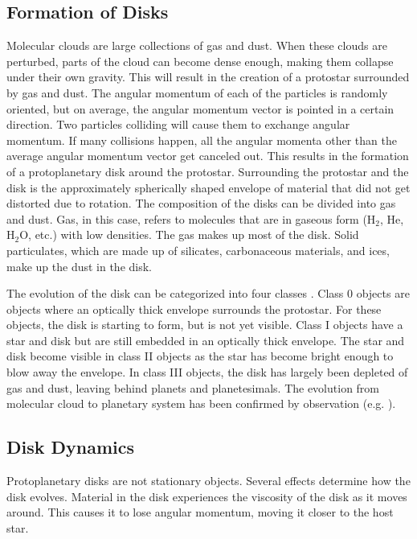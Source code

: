 \documentclass[oneside, single, authoryear, semicolon, 12pt]{lion-msc}
\newcommand{\4}{$_4$}
\newcommand{\3}{$_3$}
\newcommand{\2}{$_2$}
\begin{document}
\subsection{Formation of Disks}
Molecular clouds are large collections of gas and dust. When these clouds are perturbed, parts of the cloud can become dense enough, making them collapse under their own gravity. This will result in the creation of a protostar surrounded by gas and dust. The angular momentum of each of the particles is randomly oriented, but on average, the angular momentum vector is pointed in a certain direction. Two particles colliding will cause them to exchange angular momentum. If many collisions happen, all the angular momenta other than the average angular momentum vector get canceled out. This results in the formation of a protoplanetary disk around the protostar. Surrounding the protostar and the disk is the approximately spherically shaped envelope of material that did not get distorted due to rotation. The composition of the disks can be divided into gas and dust. Gas, in this case, refers to molecules that are in gaseous form (H\2, He, H\2O, etc.) with low densities. The gas makes up most of the disk. Solid particulates, which are made up of silicates, carbonaceous materials, and ices, make up the dust in the disk.

The evolution of the disk can be categorized into four classes \citep{1987ApJ...312..788A}. Class 0 objects are objects where an optically thick envelope surrounds the protostar. For these objects, the disk is starting to form, but is not yet visible. Class I objects have a star and disk but are still embedded in an optically thick envelope. The star and disk become visible in class II objects as the star has become bright enough to blow away the envelope. In class III objects, the disk has largely been depleted of gas and dust, leaving behind planets and planetesimals. The evolution from molecular cloud to planetary system has been confirmed by observation (e.g. \cite{source}).

\subsection{Disk Dynamics}
Protoplanetary disks are not stationary objects. Several effects determine how the disk evolves. Material in the disk experiences the viscosity of the disk as it moves around. This causes it to lose angular momentum, moving it closer to the host star.
\end{document}
